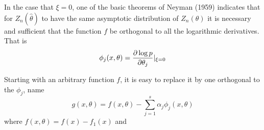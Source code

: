 In the case that \(\xi=0\), one of the basic theorems of Neyman (1959) indicates that for \(Z_n(\hat\theta)\) to have the same asymptotic distribution of  \(Z_n(\theta)\) it is necessary and sufficient that the function  \(f\) be orthogonal to all the logarithmic derivatives. That is 
\begin{equation}
	\label{eq:neyman-4}
	\phi_j(x,\theta) = \frac{\partial \log p}{\partial \theta_j}\large|_{\xi=0} 
\end{equation}

Starting with an arbitrary function \(f\), it is easy to replace it by one orthogonal to the \(\phi_j\), name 
 \begin{equation}
	\label{eq:neyman-5}
	g(x,\theta) = f(x,\theta)-\sum_{j=1}^s \alpha_j\phi_j(x,\theta)
\end{equation}
where \(f(x,\theta) = f(x)-f_1(x)\) and

